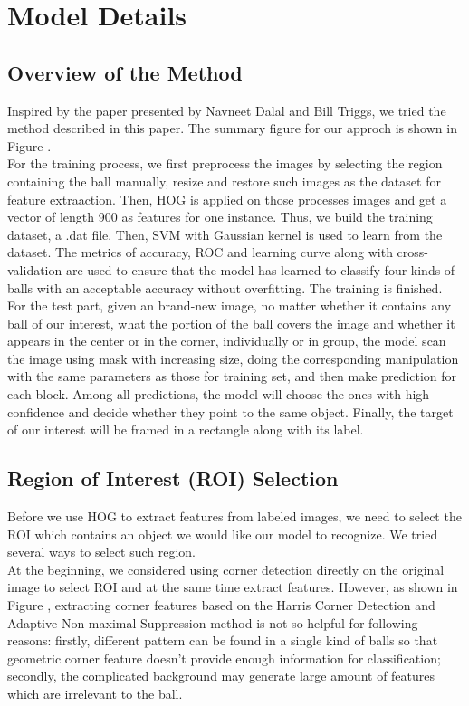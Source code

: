 \documentclass{article}
\begin{document}
\section{Model Details} 

\subsection{Overview of the Method}
Inspired by the paper \cite{dalal2005histograms} presented by Navneet Dalal and Bill Triggs, we tried the method described in this paper. The summary figure for our approch is shown in Figure .\\
For the training process, we first preprocess the images by selecting the region containing the ball manually, resize and restore such images as the dataset for feature extraaction. Then, HOG is applied on those processes images and get a vector of length $900$ as features for one instance. Thus, we build the training dataset, a .dat file. Then, SVM with Gaussian kernel is used to learn from the dataset. The metrics of accuracy, ROC and learning curve along with cross-validation are used to ensure that the model has learned to classify four kinds of balls with an acceptable accuracy without overfitting. The training is finished. \\
For the test part, given an brand-new image, no matter whether it contains any ball of our interest, what the portion of the ball covers the image and whether it appears in the center or in the corner, individually or in group, the model scan the image using mask with increasing size, doing the corresponding manipulation with the same parameters as those for training set, and then make prediction for each block. Among all predictions, the model will choose the ones with high confidence and decide whether they point to the same object. Finally, the target of our interest will be framed in a rectangle along with its label.

\subsection{Region of Interest (ROI) Selection}
Before we use HOG to extract features from labeled images, we need to select the ROI which contains an object we would like our model to recognize. We tried several ways to select such region.\\
At the beginning, we considered using corner detection directly on the original image to select ROI and at the same time extract features. However, as shown in Figure \cite{crd}, extracting corner features based on the Harris Corner Detection and Adaptive Non-maximal Suppression method \cite{brown2005multi} is not so helpful for following reasons: firstly, different pattern can be found in a single kind of balls so that geometric corner feature doesn't provide enough information for classification; secondly, the complicated background may generate large amount of features which are irrelevant to the ball.\\
\end{document}
